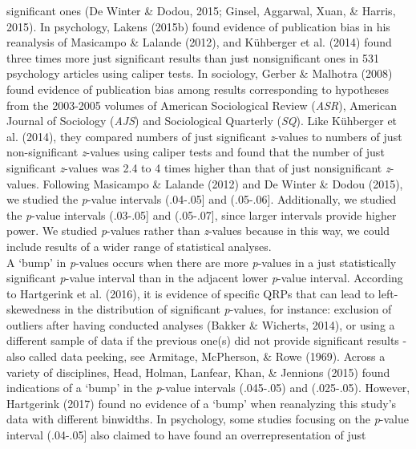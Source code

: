 \documentclass[
  12pt,
]{article}
\begin{document}
significant ones (De Winter \& Dodou, 2015; Ginsel, Aggarwal, Xuan, \&
Harris, 2015). In psychology, Lakens (2015b) found evidence of
publication bias in his reanalysis of Masicampo \& Lalande (2012), and
Kühberger et al. (2014) found three times more just significant results
than just nonsignificant ones in 531 psychology articles using caliper
tests. In sociology, Gerber \& Malhotra (2008) found evidence of
publication bias among results corresponding to hypotheses from the
2003-2005 volumes of American Sociological Review (\emph{ASR}), American
Journal of Sociology (\emph{AJS}) and Sociological Quarterly
(\emph{SQ}). Like Kühberger et al. (2014), they compared numbers of just
significant \emph{z}-values to numbers of just non-significant
\emph{z}-values using caliper tests and found that the number of just
significant \emph{z}-values was 2.4 to 4 times higher than that of just
nonsignificant \emph{z}-values. Following Masicampo \& Lalande (2012)
and De Winter \& Dodou (2015), we studied the \emph{p}-value intervals
(.04-.05{]} and (.05-.06{]}. Additionally, we studied the \emph{p}-value
intervals (.03-.05{]} and (.05-.07{]}, since larger intervals provide
higher power. We studied \emph{p}-values rather than \emph{z}-values
because in this way, we could include results of a wider range of
statistical analyses.\\
\hspace*{0.333em}\hspace*{0.333em}\hspace*{0.333em}\hspace*{0.333em}A
`bump' in \emph{p}-values occurs when there are more \emph{p}-values in
a just statistically significant \emph{p}-value interval than in the
adjacent lower \emph{p}-value interval. According to Hartgerink et al.
(2016), it is evidence of specific QRPs that can lead to left-skewedness
in the distribution of significant \emph{p}-values, for instance:
exclusion of outliers after having conducted analyses (Bakker \&
Wicherts, 2014), or using a different sample of data if the previous
one(s) did not provide significant results - also called data peeking,
see Armitage, McPherson, \& Rowe (1969). Across a variety of
disciplines, Head, Holman, Lanfear, Khan, \& Jennions (2015) found
indications of a `bump' in the \emph{p}-value intervals (.045-.05) and
(.025-.05). However, Hartgerink (2017) found no evidence of a `bump'
when reanalyzing this study's data with different binwidths. In
psychology, some studies focusing on the \emph{p}-value interval
(.04-.05{]} also claimed to have found an overrepresentation of just
\end{document}

